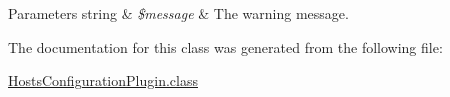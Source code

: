 \begin{DoxyParams}[1]{Parameters}
string & {\em \$message} & The warning message. \\
\hline
\end{DoxyParams}


The documentation for this class was generated from the following file\-:\begin{DoxyCompactItemize}
\item 
\hyperlink{HostsConfigurationPlugin_8class}{Hosts\-Configuration\-Plugin.\-class}\end{DoxyCompactItemize}
